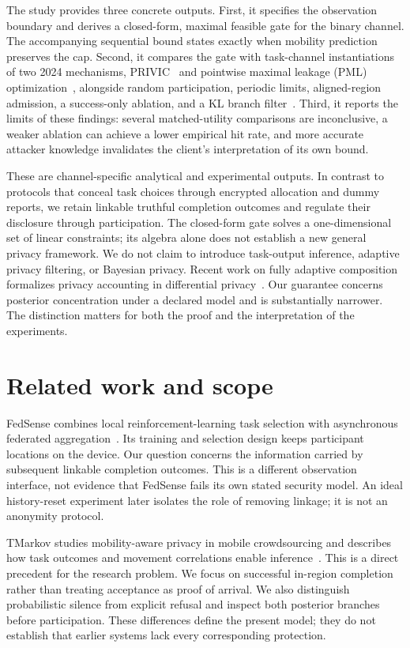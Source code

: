 \documentclass[3p,times]{elsarticle}
\begin{document}
The study provides three concrete outputs. First, it specifies the observation boundary and derives a closed-form, maximal feasible gate for the binary channel. The accompanying sequential bound states exactly when mobility prediction preserves the cap. Second, it compares the gate with task-channel instantiations of two 2024 mechanisms, PRIVIC~\cite{privic2024} and pointwise maximal leakage (PML) optimization~\cite{pml2024}, alongside random participation, periodic limits, aligned-region admission, a success-only ablation, and a KL branch filter~\cite{bayesian}. Third, it reports the limits of these findings: several matched-utility comparisons are inconclusive, a weaker ablation can achieve a lower empirical hit rate, and more accurate attacker knowledge invalidates the client's interpretation of its own bound.

These are channel-specific analytical and experimental outputs. In contrast to protocols that conceal task choices through encrypted allocation and dummy reports, we retain linkable truthful completion outcomes and regulate their disclosure through participation. The closed-form gate solves a one-dimensional set of linear constraints; its algebra alone does not establish a new general privacy framework. We do not claim to introduce task-output inference, adaptive privacy filtering, or Bayesian privacy. Recent work on fully adaptive composition formalizes privacy accounting in differential privacy~\cite{adaptive2023}. Our guarantee concerns posterior concentration under a declared model and is substantially narrower. The distinction matters for both the proof and the interpretation of the experiments.

\section{Related work and scope}
\label{sec:related}
FedSense combines local reinforcement-learning task selection with asynchronous federated aggregation~\cite{fedsense2025}. Its training and selection design keeps participant locations on the device. Our question concerns the information carried by subsequent linkable completion outcomes. This is a different observation interface, not evidence that FedSense fails its own stated security model. An ideal history-reset experiment later isolates the role of removing linkage; it is not an anonymity protocol.

TMarkov studies mobility-aware privacy in mobile crowdsourcing and describes how task outcomes and movement correlations enable inference~\cite{tmarkov}. This is a direct precedent for the research problem. We focus on successful in-region completion rather than treating acceptance as proof of arrival. We also distinguish probabilistic silence from explicit refusal and inspect both posterior branches before participation. These differences define the present model; they do not establish that earlier systems lack every corresponding protection.
\end{document}
